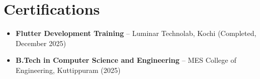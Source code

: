 \documentclass[letterpaper,10pt]{article}
\newcommand{\resumeItem}[1]{
  \item\small{
    {#1 \vspace{-2pt}}
  }
}
\newcommand{\resumeSubHeadingListStart}{\begin{itemize}[leftmargin=0.15in, label={}]}
\newcommand{\resumeSubHeadingListEnd}{\end{itemize}}
\begin{document}
\section{Certifications}
  \resumeSubHeadingListStart
    \resumeItem{\textbf{Flutter Development Training} -- Luminar Technolab, Kochi (Completed, December 2025)}
    \resumeItem{\textbf{B.Tech in Computer Science and Engineering} -- MES College of Engineering, Kuttippuram (2025)}
  \resumeSubHeadingListEnd

\end{document}
